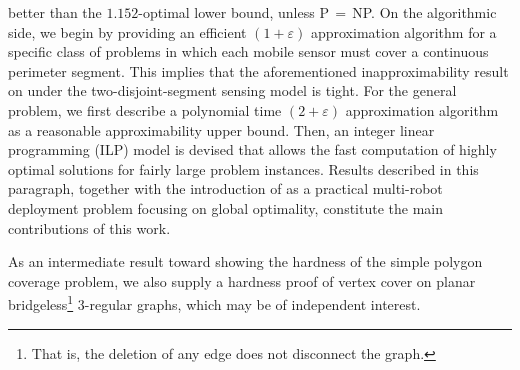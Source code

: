better than the $1.152$-optimal lower bound, unless P$\,=\,$NP. 
%
On the algorithmic side, we begin by providing an efficient $(1+\varepsilon)$
approximation algorithm
for a specific class of \opgt problems in which each mobile 
sensor must cover a continuous perimeter segment. This implies that the 
aforementioned inapproximability result on \opgt under the 
two-disjoint-segment sensing model is tight. 
%
For the general \osgt problem, we first describe a polynomial time 
$(2+\varepsilon)$ approximation algorithm as a reasonable approximability 
upper bound. 
%
Then, an integer linear programming (ILP) model is devised that allows 
the fast computation of highly optimal solutions for fairly large 
problem instances. 
%
Results described in this paragraph, together with the introduction 
of \osgt as a practical multi-robot deployment problem focusing on global 
optimality, constitute the main contributions of this work. 

As an intermediate result toward showing the hardness of the simple polygon
coverage problem, we also supply a hardness proof of vertex cover 
on planar bridgeless\footnote{That is, the deletion of any edge does not disconnect 
the graph.} $3$-regular graphs, which may be of independent interest. 


